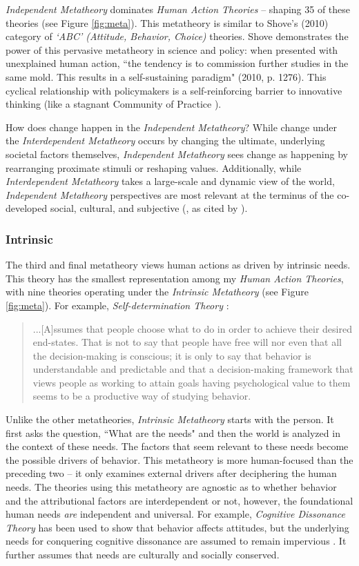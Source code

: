 \documentclass[12 pt]{article}
\begin{document}
	\textit{Independent Metatheory} dominates \textit{Human Action Theories} -- shaping 35 of these theories (see Figure \ref{fig:meta}). This metatheory is similar to Shove's (2010) category of \textit{`ABC' (Attitude, Behavior, Choice)} theories. Shove demonstrates the power of this pervasive metatheory in science and policy: when presented with unexplained human action, ``the tendency is to commission further studies in the same mold. This results in a self-sustaining paradigm" (2010, p. 1276). This cyclical relationship with policymakers is a self-reinforcing barrier to innovative thinking (like a stagnant Community of Practice \parencite{Wenger1998}). 
	
	How does change happen in the \textit{Independent Metatheory}? While change under the \textit{Interdependent Metatheory} occurs by changing the ultimate, underlying societal factors themselves, \textit{Independent Metatheory} sees change as happening by rearranging proximate stimuli or reshaping values. Additionally, while \textit{Interdependent Metatheory} takes a large-scale and dynamic view of the world, \textit{Independent Metatheory} perspectives are most relevant at the terminus of the co-developed social, cultural, and subjective (\textcite{Uzzell2008}, as cited by \textcite{Shove2010}). 

	\subsubsection{Intrinsic}
	The third and final metatheory views human actions as driven by intrinsic needs. This theory has the smallest representation among my \textit{Human Action Theories}, with nine theories operating under the \textit{Intrinsic Metatheory} (see Figure \ref{fig:meta}). For example, \textit{Self-determination Theory} \parencite[][p. 132-3]{Deci1976}:  \blockquote{...[A]ssumes that people choose what to
		do in order to achieve their desired end-states. That is not to say that
		people have free will nor even that all the decision-making is conscious;
		it is only to say that behavior is understandable and predictable and that
		a decision-making framework that views people as working to attain goals having psychological value to them seems to be a productive way of studying behavior.} 
	 Unlike the other metatheories, \textit{Intrinsic Metatheory} starts with the person. It first asks the question, ``What are the needs" and then the world is analyzed in the context of these needs. The factors that seem relevant to these needs become the possible drivers of behavior. This metatheory is more human-focused than the preceding two -- it only examines external drivers after deciphering the human needs. The theories using this metatheory are agnostic as to whether behavior and the attributional factors are interdependent or not, however, the foundational human needs \textit{are} independent and universal. For example, \textit{Cognitive Dissonance Theory} has been used to show that behavior affects attitudes, but the underlying needs for conquering cognitive dissonance are assumed to remain impervious \parencite{Festinger1959}. It further assumes that needs are culturally and socially conserved. 
	 
\end{document}
